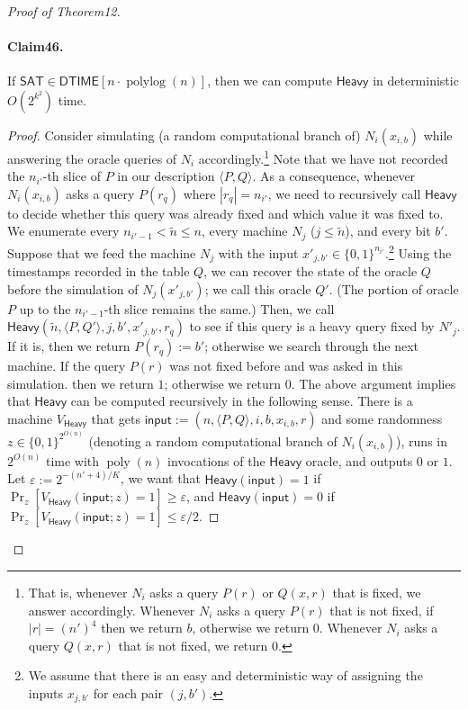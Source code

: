 \begin{proof}[Proof of Theorem12]
\paragraph{Claim46.} If $\mathsf{SAT}\in\mathsf{DTIME}[n\cdot\operatorname{polylog}(n)]$, then we can compute $\mathsf{Heavy}$ in deterministic $O(2^{k^2})$ time.
\begin{proof}
Consider simulating (a random computational branch of) $N_i(x_{i,b})$ while answering the oracle queries of $N_i$ accordingly.\footnote{That is, whenever $N_i$ asks a query $P(r)$ or $Q(x,r)$ that is fixed, we answer accordingly. Whenever $N_i$ asks a query $P(r)$ that is not fixed, if $|r|=(n')^4$ then we return $b$, otherwise we return $0$. Whenever $N_i$ asks a query $Q(x,r)$ that is not fixed, we return $0$.} Note that we have not recorded the $n_{i'}$-th slice of $P$ in our description $\langle P,Q\rangle$. As a consequence, whenever $N_i(x_{i,b})$ asks a query $P(r_q)$ where $|r_q|=n_{i'}$, we need to recursively call $\mathsf{Heavy}$ to decide whether this query was already fixed and which value it was fixed to. We enumerate every $n_{i'-1}<\tilde n\leq n$, every machine $N_j$ ($j\leq\tilde n$), and every bit $b'$. Suppose that we feed the machine $N_j$ with the input $x'_{j,b'}\in\{0,1\}^{n_{i'}}$.\footnote{We assume that there is an easy and deterministic way of assigning the inputs $x_{j,b'}$ for each pair $(j,b')$.} Using the timestamps recorded in the table $Q$, we can recover the state of the oracle $Q$ before the simulation of $N_j(x'_{j,b'})$; we call this oracle $Q'$. (The portion of oracle $P$ up to the $n_{i'-1}$-th slice remains the same.) Then, we call $\mathsf{Heavy}(\tilde n,\langle P,Q'\rangle,j,b',x'_{j,b'},r_q)$ to see if this query is a heavy query fixed by $N'_j$. If it is, then we return $P(r_q):=b'$; otherwise we search through the next machine. If the query $P(r)$ was not fixed before and was asked in this simulation. then we return $1$; otherwise we return $0$.
The above argument implies that $\mathsf{Heavy}$ can be computed recursively in the following sense. There is a machine $V_{\mathsf{Heavy}}$ that gets $\mathsf{input}:=(n,\langle P,Q\rangle,i,b,x_{i,b},r)$ and some randomness $z\in\{0,1\}^{2^{O(n)}}$ (denoting a random computational branch of $N_i(x_{i,b})$), runs in $2^{O(n)}$ time with $\operatorname{poly}(n)$ invocations of the $\mathsf{Heavy}$ oracle, and outputs $0$ or $1$. Let $\varepsilon:=2^{-(n'+4)/K}$, we want that $\mathsf{Heavy}(\mathsf{input})=1$ if $\Pr_z[V_{\mathsf{Heavy}}(\mathsf{input};z)=1]\geq\varepsilon$, and $\mathsf{Heavy}(\mathsf{input})=0$ if $\Pr_z[V_{\mathsf{Heavy}}(\mathsf{input};z)=1]\leq\varepsilon/2$.

\end{proof}
\end{proof}
